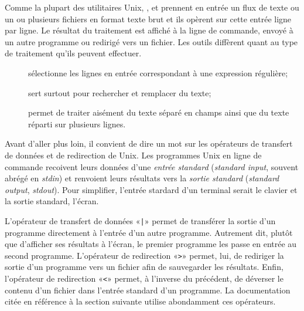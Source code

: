 Comme la plupart des utilitaires Unix, ,  et
 prennent en entrée un flux de texte ou un ou plusieurs
fichiers en format texte brut et ils opèrent sur cette entrée ligne
par ligne. Le résultat du traitement est affiché à la ligne de
commande, envoyé à un autre programme ou redirigé vers un fichier. Les
outils diffèrent quant au type de traitement qu'ils peuvent effectuer.
\begin{description}
\item[] sélectionne les lignes en entrée correspondant à
  une expression régulière;
\item[] sert surtout pour rechercher et remplacer du texte;
\item[] permet de traiter aisément du texte séparé en champs
  ainsi que du texte réparti sur plusieurs lignes.
\end{description}


Avant d'aller plus loin, il convient de dire un mot sur les opérateurs
de transfert de données et de redirection de Unix. Les
programmes Unix en ligne de commande recoivent leurs données d'une
\emph{entrée standard}
(\emph{standard input}, souvent abrégé en \emph{stdin}) et renvoient
leurs résultats vers la \emph{sortie standard} (\emph{standard
  output}, \emph{stdout}). Pour simplifier, l'entrée stardard d'un
terminal serait le clavier et la sortie standard, l'écran.

L'opérateur de transfert de données «\verb=|=» permet de transférer la
sortie d'un programme directement à l'entrée d'un autre programme.
Autrement dit, plutôt que d'afficher ses résultats à l'écran, le
premier programme les passe en entrée au second programme. L'opérateur
de redirection «\verb=>=» permet, lui, de rediriger la sortie d'un
programme vers un fichier afin de sauvegarder les résultats. Enfin,
l'opérateur de redirection «\verb=<=» permet, à l'inverse du précédent,
de déverser le contenu d'un fichier dans l'entrée standard d'un
programme. La documentation citée en référence à la section suivante
utilise abondamment ces opérateurs.

